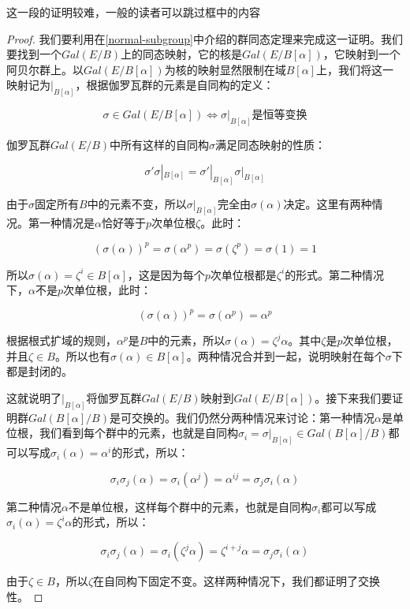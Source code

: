 \documentclass{article}
\begin{document}
\begin{mdframed}
这一段的证明较难，一般的读者可以跳过框中的内容
\begin{proof}
我们要利用在\ref{normal-subgroup}中介绍的群同态定理来完成这一证明。我们要找到一个$Gal(E/B)$上的同态映射，它的核是$Gal(E/B[\alpha])$，它映射到一个阿贝尔群上。以$Gal(E/B[\alpha])$为核的映射显然限制在域$B[\alpha]$上，我们将这一映射记为$|_{B[\alpha]}$，根据伽罗瓦群的元素是自同构的定义：

\[
\sigma \in Gal(E/B[\alpha]) \iff \sigma|_{B[\alpha]} \text{是恒等变换}
\]

伽罗瓦群$Gal(E/B)$中所有这样的自同构$\sigma$满足同态映射的性质：

\[
\sigma'\sigma|_{B[\alpha]} = \sigma'|_{B[\alpha]}\sigma|_{B[\alpha]}
\]

由于$\sigma$固定所有$B$中的元素不变，所以$\sigma|_{B[\alpha]}$完全由$\sigma(\alpha)$决定。这里有两种情况。第一种情况是$\alpha$恰好等于$p$次单位根$\zeta$。此时：

\[
(\sigma(\alpha))^p = \sigma(\alpha^p) = \sigma(\zeta^p) = \sigma(1) = 1
\]

所以$\sigma(\alpha) = \zeta^i \in B[\alpha]$，这是因为每个$p$次单位根都是$\zeta^i$的形式。第二种情况下，$\alpha$不是$p$次单位根，此时：

\[
(\sigma(\alpha))^p = \sigma(\alpha^p) = \alpha^p
\]

根据根式扩域的规则，$\alpha^p$是$B$中的元素，所以$\sigma(\alpha) = \zeta^j\alpha$。其中$\zeta$是$p$次单位根，并且$\zeta \in B$。所以也有$\sigma(\alpha) \in B[\alpha]$。两种情况合并到一起，说明映射在每个$\sigma$下都是封闭的。

这就说明了$|_{B[\alpha]}$将伽罗瓦群$Gal(E/B)$映射到$Gal(E/B[\alpha])$。接下来我们要证明群$Gal(B[\alpha]/B)$是可交换的。我们仍然分两种情况来讨论：第一种情况$\alpha$是单位根，我们看到每个群中的元素，也就是自同构$\sigma_i = \sigma|_{B[\alpha]} \in Gal(B[\alpha]/B)$都可以写成$\sigma_i(\alpha) = \alpha^i$的形式，所以：

\[
\sigma_i\sigma_j(\alpha) = \sigma_i(\alpha^j) = \alpha^{ij} = \sigma_j\sigma_i(\alpha)
\]

第二种情况$\alpha$不是单位根，这样每个群中的元素，也就是自同构$\sigma_i$都可以写成$\sigma_i(\alpha) = \zeta^i\alpha$的形式，所以：

\[
\sigma_i\sigma_j(\alpha) = \sigma_i(\zeta^j\alpha) = \zeta^{i + j}\alpha = \sigma_j\sigma_i(\alpha)
\]

由于$\zeta \in B$，所以$\zeta$在自同构下固定不变。这样两种情况下，我们都证明了交换性。
\end{proof}
\end{mdframed}
\end{document}
